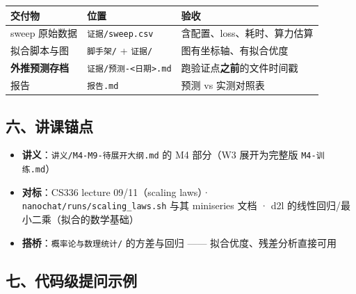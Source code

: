 \documentclass[
  chinese,
  11pt,
]{ctexart}
\newcounter{none} %
\providecommand{\tightlist}{%
  \setlength{\itemsep}{0pt}\setlength{\parskip}{0pt}}
\begin{document}
{\def\LTcaptype{none} %
\begin{longtable}[]{@{}
  >{\raggedright\arraybackslash}p{}
  >{\raggedright\arraybackslash}p{}
  >{\raggedright\arraybackslash}p{}@{}}
\toprule\noalign{}
\begin{minipage}[b]{\linewidth}\raggedright
交付物
\end{minipage} & \begin{minipage}[b]{\linewidth}\raggedright
位置
\end{minipage} & \begin{minipage}[b]{\linewidth}\raggedright
验收
\end{minipage} \\
\midrule\noalign{}
\endhead
\bottomrule\noalign{}
\endlastfoot
sweep 原始数据 & \texttt{证据/sweep.csv} & 含配置、loss、耗时、算力估算 \\
拟合脚本与图 & \texttt{脚手架/} + \texttt{证据/} & 图有坐标轴、有拟合优度 \\
\textbf{外推预测存档} & \texttt{证据/预测-\textless{}日期\textgreater{}.md} & 跑验证点\textbf{之前}的文件时间戳 \\
报告 & \texttt{报告.md} & 预测 vs 实测对照表 \\
\end{longtable}
}

\subsection{六、讲课锚点}\label{ux516dux8bb2ux8bfeux951aux70b9}

\begin{itemize}
\tightlist
\item
  \textbf{讲义}：\texttt{讲义/M4-M9-待展开大纲.md} 的 M4 部分（W3 展开为完整版 \texttt{M4-训练.md}）
\item
  \textbf{对标}：CS336 lecture 09/11（scaling laws）· \texttt{nanochat/runs/scaling\_laws.sh} 与其 miniseries 文档 · d2l 的线性回归/最小二乘（拟合的数学基础）
\item
  \textbf{搭桥}：\texttt{概率论与数理统计/} 的方差与回归 ------ 拟合优度、残差分析直接可用
\end{itemize}

\subsection{七、代码级提问示例}\label{ux4e03ux4ee3ux7801ux7ea7ux63d0ux95eeux793aux4f8b}
\end{document}
